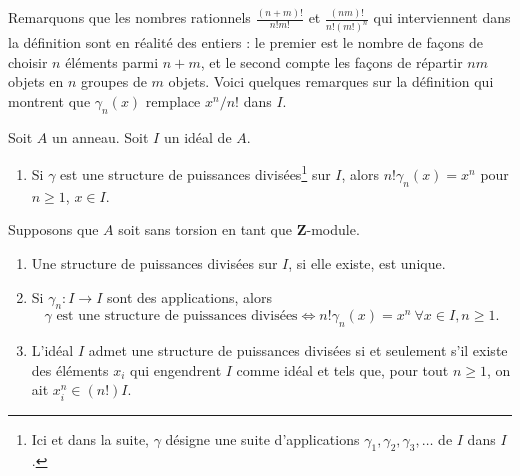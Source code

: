 \noindent
Remarquons que les nombres rationnels $\frac{(n + m)!}{n! m!}$
et $\frac{(nm)!}{n! (m!)^n}$ qui interviennent dans la définition sont en
réalité des entiers : le premier est le nombre de façons de choisir $n$
éléments parmi $n + m$, et le second compte les façons de répartir $nm$
objets en $n$ groupes de $m$ objets.
Voici quelques remarques sur la définition qui montrent que
$\gamma_n(x)$ remplace $x^n/n!$ dans $I$.

\begin{lemma}
\label{lemma-silly}
Soit $A$ un anneau. Soit $I$ un idéal de $A$.
\begin{enumerate}
\item Si $\gamma$ est une structure de puissances divisées\footnote{Ici
et dans la suite, $\gamma$ désigne une suite d'applications
$\gamma_1, \gamma_2, \gamma_3, \ldots$ de $I$ dans $I$.}
sur $I$, alors
$n! \gamma_n(x) = x^n$ pour $n \geq 1$, $x \in I$.
\end{enumerate}
Supposons que $A$ soit sans torsion en tant que $\mathbf{Z}$-module.
\begin{enumerate}
\item[(2)] Une structure de puissances divisées sur $I$, si elle existe, est unique.
\item[(3)] Si $\gamma_n : I \to I$ sont des applications, alors
$$
\gamma\text{ est une structure de puissances divisées}
\Leftrightarrow
n! \gamma_n(x) = x^n\ \forall x \in I, n \geq 1.
$$
\item[(4)] L'idéal $I$ admet une structure de puissances divisées
si et seulement s'il existe
des éléments $x_i$ qui engendrent $I$ comme idéal et tels que,
pour tout $n \geq 1$, on ait $x_i^n \in (n!)I$.
\end{enumerate}
\end{lemma}

